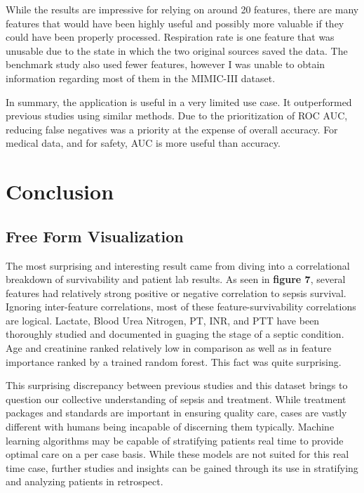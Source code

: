 \documentclass[11pt]{article}
\begin{document}
	While the results are impressive for relying on around 20 features, there are many features that would have been highly useful and possibly more valuable if they could have been properly processed. Respiration rate is one feature that was unusable due to the state in which the two original sources saved the data. The benchmark study also used fewer features, however I was unable to obtain information regarding most of them in the MIMIC-III dataset.

	
	In summary, the application is useful in a very limited use case. It outperformed previous studies using similar methods. Due to the prioritization of ROC AUC, reducing false negatives was a priority at the expense of overall accuracy. For medical data, and for safety, AUC is more useful than accuracy.
	

		
	\section{Conclusion}
	
	\subsection{Free Form Visualization}

	
	The most surprising and interesting result came from diving into a correlational breakdown of survivability and patient lab results. As seen in \textbf{figure 7}, several features had relatively strong positive or negative correlation to sepsis survival. Ignoring inter-feature correlations, most of these feature-survivability correlations are logical. Lactate, Blood Urea Nitrogen, PT, INR, and PTT have been thoroughly studied and documented in guaging the stage of a septic condition. Age and creatinine ranked relatively low in comparison as well as in feature importance ranked by a trained random forest. This fact was quite surprising. 
	
	This surprising discrepancy between previous studies and this dataset brings to question our collective understanding of sepsis and treatment. While treatment packages and standards are important in ensuring quality care, cases are vastly different with humans being incapable of discerning them typically. Machine learning algorithms may be capable of stratifying patients real time to provide optimal care on a per case basis. While these models are not suited for this real time case, further studies and insights can be gained through its use in stratifying and analyzing patients in retrospect. 
	
\end{document}
